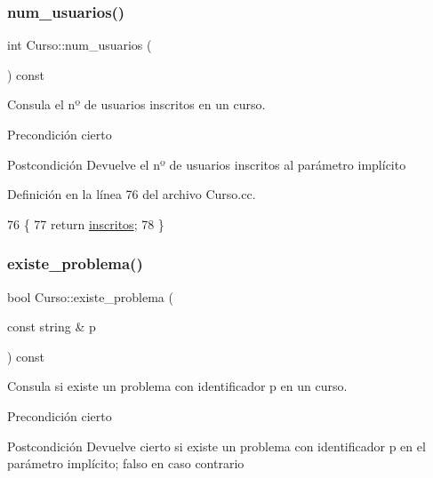 \subsubsection{\texorpdfstring{num\+\_\+usuarios()}{num\_usuarios()}}
{\footnotesize\ttfamily int Curso\+::num\+\_\+usuarios (\begin{DoxyParamCaption}{ }\end{DoxyParamCaption}) const}



Consula el nº de usuarios inscritos en un curso. 

\begin{DoxyPrecond}{Precondición}
cierto 
\end{DoxyPrecond}
\begin{DoxyPostcond}{Postcondición}
Devuelve el nº de usuarios inscritos al parámetro implícito 
\end{DoxyPostcond}


Definición en la línea 76 del archivo Curso.\+cc.


\begin{DoxyCode}
76                                     \{
77         \textcolor{keywordflow}{return} \mbox{\hyperlink{class_curso_aef03f588dd91d57a6e679d05148fd971}{inscritos}};
78       \}
\end{DoxyCode}
\mbox{\label{class_curso_a279017923bd7d0b21961953690e3bacc}} 
\subsubsection{\texorpdfstring{existe\+\_\+problema()}{existe\_problema()}}
{\footnotesize\ttfamily bool Curso\+::existe\+\_\+problema (\begin{DoxyParamCaption}\item[{const string \&}]{p }\end{DoxyParamCaption}) const}



Consula si existe un problema con identificador p en un curso. 

\begin{DoxyPrecond}{Precondición}
cierto 
\end{DoxyPrecond}
\begin{DoxyPostcond}{Postcondición}
Devuelve cierto si existe un problema con identificador p en el parámetro implícito; falso en caso contrario 
\end{DoxyPostcond}


